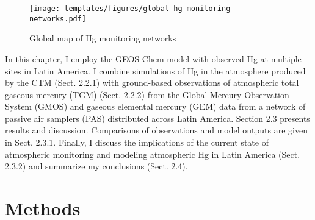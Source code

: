 \begin{figure}[H]
  \texttt{[image: templates/figures/global-hg-monitoring-networks.pdf]}
  \caption{Global map of Hg monitoring networks \cite{united_nations_environment_programme_technical_2019}}
  \label{fig:global-hg-monitoring-networks}
  \centering
  
\end{figure}
\FloatBarrier

\begin{flushleft}
 In this chapter, I employ the GEOS-Chem model with observed Hg at multiple sites in Latin America. I combine simulations of Hg in the atmosphere produced by the \gc CTM (Sect. 2.2.1) with ground-based observations of atmospheric total gaseous mercury (TGM) (Sect. 2.2.2) from the Global Mercury Observation System (GMOS)\cite{sprovieri_atmospheric_2016} and gaseous elemental mercury (GEM) data from a network of passive air samplers (PAS) distributed across Latin America. Section 2.3 presents results and discussion\cite{quant_measuring_2021}. Comparisons of observations and model outputs are given in Sect. 2.3.1. Finally, I discuss the implications of the current state of atmospheric monitoring and modeling atmospheric Hg in Latin America (Sect. 2.3.2) and summarize my conclusions (Sect. 2.4).
\end{flushleft}




\section{Methods}
